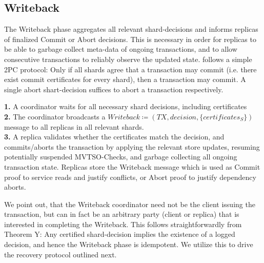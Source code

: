 \subsection{Writeback}

The Writeback phase aggregates all relevant shard-decisions and informs replicas of finalized Commit or Abort decisions. This is necessary in order for replicas to be able to garbage collect meta-data of ongoing transactions, and to allow consecutive transactions to reliably observe the updated state. \sys follows a simple 2PC protocol: Only if all shards agree that a transaction may commit (i.e. there exist commit certificates for every shard), then a transaction may commit. A single abort shart-decision suffices to abort a transaction respectively.

\textbf{1.} A coordinator waits for all necessary shard decisions, including certificates\\
\textbf{2.} The coordinator broadcasts a $Writeback \coloneqq (TX, decision, \{certificates_S \} )$ message to all replicas in all relevant shards.\\
\textbf{3.} A replica validates whether the certificates match the decision, and commits/aborts the transaction by applying the relevant store updates, resuming potentially suspended MVTSO-Checks, and garbage collecting all ongoing transaction state. Replicas store the Writeback message which is used as Commit proof to service reads and justify conflicts, or Abort proof to justify dependency aborts.

We point out, that the Writeback coordinator need not be the client issuing the transaction, but can in fact be an arbitrary party (client or replica) that is interested in completing the Writeback. This follows straightforwardly from Theorem Y: Any certified shard-decision implies the existence of a logged decision, and hence the Writeback phase is idempotent.
We utilize this to drive the recovery protocol outlined next. 

